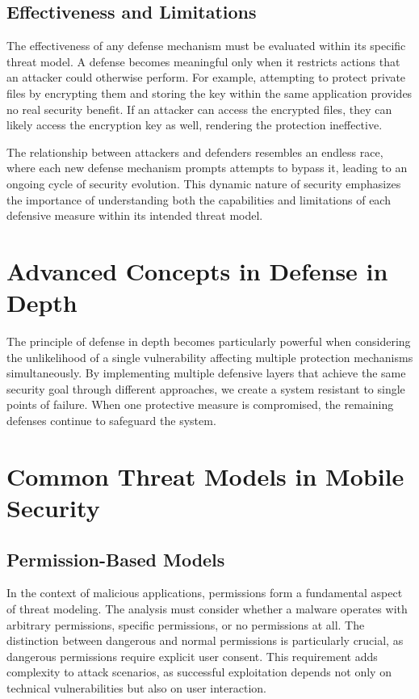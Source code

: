 \documentclass{article}
\begin{document}
\subsection{Effectiveness and Limitations}
The effectiveness of any defense mechanism must be evaluated within its specific threat model. A defense becomes meaningful only when it restricts actions that an attacker could otherwise perform. For example, attempting to protect private files by encrypting them and storing the key within the same application provides no real security benefit. If an attacker can access the encrypted files, they can likely access the encryption key as well, rendering the protection ineffective.

The relationship between attackers and defenders resembles an endless race, where each new defense mechanism prompts attempts to bypass it, leading to an ongoing cycle of security evolution. This dynamic nature of security emphasizes the importance of understanding both the capabilities and limitations of each defensive measure within its intended threat model.

\section{Advanced Concepts in Defense in Depth}
The principle of defense in depth becomes particularly powerful when considering the unlikelihood of a single vulnerability affecting multiple protection mechanisms simultaneously. By implementing multiple defensive layers that achieve the same security goal through different approaches, we create a system resistant to single points of failure. When one protective measure is compromised, the remaining defenses continue to safeguard the system.

\section{Common Threat Models in Mobile Security}
\subsection{Permission-Based Models}
In the context of malicious applications, permissions form a fundamental aspect of threat modeling. The analysis must consider whether a malware operates with arbitrary permissions, specific permissions, or no permissions at all. The distinction between dangerous and normal permissions is particularly crucial, as dangerous permissions require explicit user consent. This requirement adds complexity to attack scenarios, as successful exploitation depends not only on technical vulnerabilities but also on user interaction.
\end{document}
